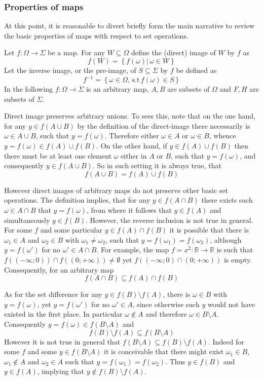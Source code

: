 \documentclass[a4paper]{article}
\newcommand{\obj}[1]{\left\{{#1}\right\}}
\begin{document}


\subsubsection{Properties of maps} %
\label{ssub:properties_of_maps}
At this point, it is reasonable to divert briefly form the main narrative to review the basic properties of maps with respect to set operations.

Let $f:\Omega\to \Sigma$ be a map.
For any $W\subseteq \Omega$ define the (direct) image of $W$ by $f$ as \[f(W)= \obj{f(\omega)\vert\, \omega\in W}\]
Let the inverse image, or the pre-image, of $S\subseteq \Sigma$ by $f$ be defined as \[f^{-1}=\obj{\omega\in \Omega,\,\text{s.t}\,f(\omega)\in S}\]
In the following $f:\Omega\to\Sigma$ is an arbitrary map, $A,B$ are subsets of $\Omega$ and $F, H$ are subsets of $\Sigma$.

Direct image preserves arbitrary unions. To sees this, note that on the one hand, for any $y\in f(A\cup B)$ by the definition of the direct-image there necessarily is $\omega\in A\cup B$, such that $y=f(\omega)$. Therefore either $\omega\in A$ or $\omega\in B$, whence $y=f(\omega)\in f(A)\cup f(B)$. On the other hand, if $y\in f(A)\cup f(B)$ then there must be at least one element $\omega$ either in $A$ or $B$, such that $y=f(\omega)$, and consequently $y\in f(A\cup B)$. So in such setting it is always true, that \[f(A\cup B) = f(A)\cup f(B)\]

However direct images of arbitrary maps do not preserve other basic set operations. The definition implies, that for any $y\in f(A\cap B)$ there exists such $\omega\in A\cap B$ that $y=f(\omega)$, from where it follows that $y\in f(A)$ and simultaneously $y\in f(B)$.
However, the reverse inclusion is not true in general. For some $f$ and some particular $y\in f(A)\cap f(B)$ it is possible that there is $\omega_1\in A$ and $\omega_2\in B$ with $\omega_1\neq\omega_2$, such that $y=f(\omega_1)=f(\omega_2)$, although $y=f(\omega')$ for no $\omega'\in A\cap B$. For example, the map $f=x^2:\mathbb{R}\to\mathbb{R}$ is such that $f((-\infty;0))\cap f((0;+\infty))\neq \emptyset$ yet $f((-\infty;0)\cap (0;+\infty))$ is empty. Consequently, for an arbitrary map \[f(A\cap B) \subseteq f(A)\cap f(B)\]

As for the set difference for any $y\in f(B)\setminus f(A)$, there is $\omega \in B$ with $y=f(\omega)$, yet $y=f(\omega')$ for no $\omega'\in A$, since otherwise such $y$ would not have existed in the first place. In particular $\omega\notin A$ and therefore $\omega\in B\setminus A$. Consequently $y=f(\omega)\in f(B\setminus A)$ and \[f(B)\setminus f(A) \subseteq f(B\setminus A)\]
However it is not true in general that $f(B\setminus A)\subseteq f(B)\setminus f(A)$. Indeed for some $f$ and some $y\in f(B\setminus A)$ it is conceivable that there might exist $\omega_1\in B$, $\omega_1\notin A$ and $\omega_2\in A$ such that $y=f(\omega_1)=f(\omega_2)$. Thus $y\in f(B)$ and $y\in f(A)$, implying that $y\notin f(B)\setminus f(A)$.
\end{document}
